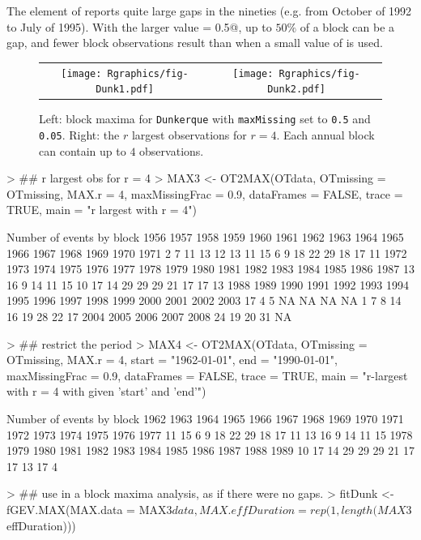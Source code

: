 \documentclass[a4paper]{report}
\begin{document}
\noindent
The \verb@OTmissing@ element of \verb@Dunkerque@ reports quite large
gaps in the nineties (e.g. from October of 1992 to July of 1995).  With the
larger value \verb@maxMissingFrac = 0.5@, up to $50\%$ of a block can
be a gap, and fewer \verb@NA@ block observations result than when
a small value of \verb@maxMissingFrac@ is used.



\begin{figure}
\begin{tabular}{c c} 
     \texttt{[image: Rgraphics/fig-Dunk1.pdf]} & 
     \texttt{[image: Rgraphics/fig-Dunk2.pdf]} 
   \end{tabular}
   \caption{\label{DUNKMAX} Left: block maxima for \texttt{Dunkerque}
   with \texttt{maxMissing} set to \texttt{0.5} and
   \texttt{0.05}. Right: the $r$ largest observations 
   for $r=4$. Each annual block can contain up to $4$ 
   observations.
 }
\end{figure}

\begin{Schunk}
\begin{Sinput}
> ## r largest obs for r = 4
> MAX3 <- OT2MAX(OTdata, OTmissing = OTmissing, MAX.r = 4,
                 maxMissingFrac = 0.9, 
                 dataFrames = FALSE, trace = TRUE,
                 main = "r largest with r = 4")
\end{Sinput}
\begin{Soutput}
Number of events by block 
1956 1957 1958 1959 1960 1961 1962 1963 1964 1965 1966 1967 1968 1969 1970 1971 
   2    7   11   13   12   13   11   15    6    9   18   22   29   18   17   11 
1972 1973 1974 1975 1976 1977 1978 1979 1980 1981 1982 1983 1984 1985 1986 1987 
  13   16    9   14   11   15   10   17   14   29   29   29   21   17   17   13 
1988 1989 1990 1991 1992 1993 1994 1995 1996 1997 1998 1999 2000 2001 2002 2003 
  17    4    5   NA   NA   NA   NA    1    7    8   14   16   19   28   22   17 
2004 2005 2006 2007 2008 
  24   19   20   31   NA 
\end{Soutput}
\begin{Sinput}
> ## restrict the period
> MAX4 <- OT2MAX(OTdata, OTmissing = OTmissing, MAX.r = 4,
                 start = "1962-01-01",
                 end = "1990-01-01",
                 maxMissingFrac = 0.9, 
                 dataFrames = FALSE, trace = TRUE,
                 main = "r-largest with r = 4 with given 'start' and 'end'")
\end{Sinput}
\begin{Soutput}
Number of events by block 
1962 1963 1964 1965 1966 1967 1968 1969 1970 1971 1972 1973 1974 1975 1976 1977 
  11   15    6    9   18   22   29   18   17   11   13   16    9   14   11   15 
1978 1979 1980 1981 1982 1983 1984 1985 1986 1987 1988 1989 
  10   17   14   29   29   29   21   17   17   13   17    4 
\end{Soutput}
\begin{Sinput}
> ## use in a block maxima analysis, as if there were no gaps.
> fitDunk <- fGEV.MAX(MAX.data = MAX3$data,
                      MAX.effDuration = rep(1, length(MAX3$effDuration)))   
\end{Sinput}
\end{Schunk}
\end{document}
